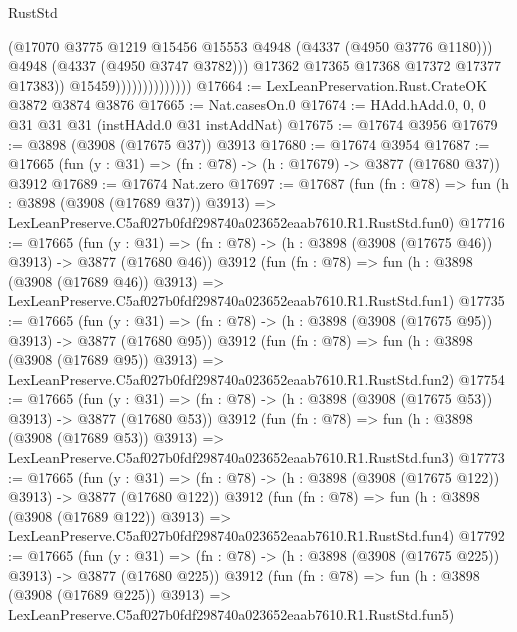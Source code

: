 \begin{lexlean}{RustStd}
\begin{coremodule}
                                      (@17070
                                        @3775
                                        @1219
                                        @15456
                                        @15553
                                        @4948
                                        (@4337 (@4950 @3776 @1180)))
                                      @4948
                                      (@4337 (@4950 @3747 @3782)))
                                    @17362
                                    @17365
                                    @17368
                                    @17372
                                    @17377
                                    @17383))
                                @15459))))))))))))))
@17664 := LexLeanPreservation.Rust.CrateOK @3872 @3874 @3876
@17665 := Nat.casesOn.{0}
@17674 := HAdd.hAdd.{0, 0, 0} @31 @31 @31 (instHAdd.{0} @31 instAddNat)
@17675 := @17674 @3956
@17679 := @3898 (@3908 (@17675 @37)) @3913
@17680 := @17674 @3954
@17687 := @17665 (fun (y : @31) => (fn : @78) -> (h : @17679) -> @3877 (@17680 @37)) @3912
@17689 := @17674 Nat.zero
@17697 := @17687
    (fun (fn : @78) =>
    fun (h : @3898 (@3908 (@17689 @37)) @3913) =>
    LexLeanPreserve.C5af027b0fdf298740a023652eaab7610.R1.RustStd.fun0)
@17716 := @17665
    (fun (y : @31) => (fn : @78) -> (h : @3898 (@3908 (@17675 @46)) @3913) -> @3877 (@17680 @46))
    @3912
    (fun (fn : @78) =>
    fun (h : @3898 (@3908 (@17689 @46)) @3913) =>
    LexLeanPreserve.C5af027b0fdf298740a023652eaab7610.R1.RustStd.fun1)
@17735 := @17665
    (fun (y : @31) => (fn : @78) -> (h : @3898 (@3908 (@17675 @95)) @3913) -> @3877 (@17680 @95))
    @3912
    (fun (fn : @78) =>
    fun (h : @3898 (@3908 (@17689 @95)) @3913) =>
    LexLeanPreserve.C5af027b0fdf298740a023652eaab7610.R1.RustStd.fun2)
@17754 := @17665
    (fun (y : @31) => (fn : @78) -> (h : @3898 (@3908 (@17675 @53)) @3913) -> @3877 (@17680 @53))
    @3912
    (fun (fn : @78) =>
    fun (h : @3898 (@3908 (@17689 @53)) @3913) =>
    LexLeanPreserve.C5af027b0fdf298740a023652eaab7610.R1.RustStd.fun3)
@17773 := @17665
    (fun (y : @31) => (fn : @78) -> (h : @3898 (@3908 (@17675 @122)) @3913) -> @3877 (@17680 @122))
    @3912
    (fun (fn : @78) =>
    fun (h : @3898 (@3908 (@17689 @122)) @3913) =>
    LexLeanPreserve.C5af027b0fdf298740a023652eaab7610.R1.RustStd.fun4)
@17792 := @17665
    (fun (y : @31) => (fn : @78) -> (h : @3898 (@3908 (@17675 @225)) @3913) -> @3877 (@17680 @225))
    @3912
    (fun (fn : @78) =>
    fun (h : @3898 (@3908 (@17689 @225)) @3913) =>
    LexLeanPreserve.C5af027b0fdf298740a023652eaab7610.R1.RustStd.fun5)

\end{coremodule}
\end{lexlean}
